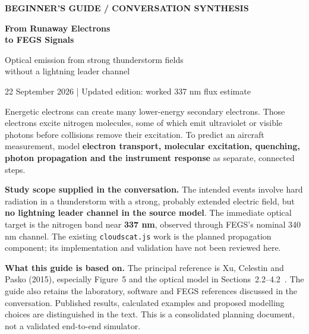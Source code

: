 \documentclass[11pt,a4paper]{article}
\begin{document}
\thispagestyle{empty}
{\sffamily\small\bfseries\color{muted}BEGINNER'S GUIDE \quad / \quad CONVERSATION SYNTHESIS}
\vspace{9mm}

{\sffamily\fontsize{28}{32}\selectfont\bfseries\color{ink}From Runaway Electrons\\to FEGS Signals\par}
\vspace{4mm}
{\sffamily\large Optical emission from strong thunderstorm fields\\without a lightning leader channel\par}
\vspace{4mm}
{\small 22 September 2026 \quad | \quad Updated edition: worked 337 nm flux estimate}

\begin{keybox}
Energetic electrons can create many lower-energy secondary electrons. Those electrons excite nitrogen molecules, some of which emit ultraviolet or visible photons before collisions remove their excitation. To predict an aircraft measurement, model \textbf{electron transport, molecular excitation, quenching, photon propagation and the instrument response} as separate, connected steps.
\end{keybox}

\textbf{Study scope supplied in the conversation.} The intended events involve hard radiation in a thunderstorm with a strong, probably extended electric field, but \textbf{no lightning leader channel in the source model}. The immediate optical target is the nitrogen band near \textbf{337 nm}, observed through FEGS's nominal 340 nm channel. The existing \texttt{cloudscat.js} work is the planned propagation component; its implementation and validation have not been reviewed here.

\textbf{What this guide is based on.} The principal reference is Xu, Celestin and Pasko (2015), especially Figure~5 and the optical model in Sections~2.2--4.2~\cite{Xu2015}. The guide also retains the laboratory, software and FEGS references discussed in the conversation. Published results, calculated examples and proposed modelling choices are distinguished in the text. This is a consolidated planning document, not a validated end-to-end simulator.
\end{document}
